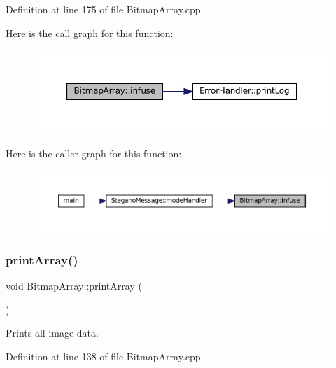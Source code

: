 Definition at line 175 of file Bitmap\+Array.\+cpp.

Here is the call graph for this function\+:\nopagebreak
\begin{figure}[H]
\begin{center}
\leavevmode
\includegraphics[width=350pt]{classBitmapArray_afb549703b79c26499fc443f187bb3d6a_cgraph}
\end{center}
\end{figure}
Here is the caller graph for this function\+:\nopagebreak
\begin{figure}[H]
\begin{center}
\leavevmode
\includegraphics[width=350pt]{classBitmapArray_afb549703b79c26499fc443f187bb3d6a_icgraph}
\end{center}
\end{figure}
\mbox{\label{classBitmapArray_a0580ddeedca7f59fd8d43ec92e6bb4a1}} 
\subsubsection{\texorpdfstring{printArray()}{printArray()}\hspace{0.1cm}{\footnotesize\ttfamily [1/2]}}
{\footnotesize\ttfamily void Bitmap\+Array\+::print\+Array (\begin{DoxyParamCaption}{ }\end{DoxyParamCaption})}



Prints all image data. 



Definition at line 138 of file Bitmap\+Array.\+cpp.

